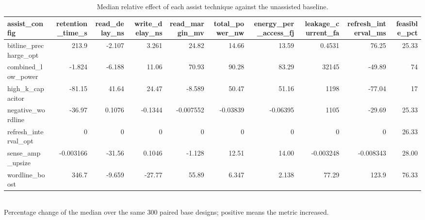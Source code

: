 \begin{table}[!t]
\centering
\caption{Median relative effect of each assist technique against the unassisted baseline.}
\label{tab:assist_relative_effect_main}
\footnotesize
\begin{tabular}{lrrrrrrrrr}
\toprule
assist\_config & retention\_time\_s & read\_delay\_ns & write\_delay\_ns & read\_margin\_mv & total\_power\_nw & energy\_per\_access\_fj & leakage\_current\_fa & refresh\_interval\_ms & feasible\_pct \\
\midrule
bitline\_precharge\_opt & 213.9 & -2.107 & 3.261 & 24.82 & 14.66 & 13.59 & 0.4531 & 76.25 & 25.33 \\
combined\_low\_power & -1.824 & -6.188 & 11.06 & 70.93 & 90.28 & 83.29 & 32145 & -49.89 & 74 \\
high\_k\_capacitor & -81.15 & 41.64 & 24.47 & -8.589 & 50.47 & 51.16 & 1198 & -77.04 & 17 \\
negative\_wordline & -36.97 & 0.1076 & -0.1344 & -0.007552 & -0.03839 & -0.06395 & 1105 & -29.69 & 25.33 \\
refresh\_interval\_opt & 0 & 0 & 0 & 0 & 0 & 0 & 0 & 0 & 26.33 \\
sense\_amp\_upsize & -0.003166 & -31.56 & 0.1046 & -1.128 & 12.51 & 14.00 & -0.003248 & -0.008343 & 28.00 \\
wordline\_boost & 346.7 & -9.659 & -27.77 & 55.89 & 6.347 & 2.138 & 77.29 & 123.9 & 76.33 \\
\bottomrule
\end{tabular}
\\[2pt] \footnotesize Percentage change of the median over the same 300 paired base designs; positive means the metric increased.
\end{table}

